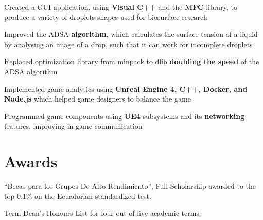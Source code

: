\documentclass[]{deedy-resume-openfont}
\begin{document}
\begin{minipage}[t]{0.66\textwidth}
\begin{tightemize}
    \item Created a GUI application, using \textbf{Visual C++} and the \textbf{MFC} library, to produce a variety of droplets shapes used for biosurface research
    \item Improved the ADSA \textbf{algorithm}, which calculates the surface tension of a liquid by analysing an image of a drop, such that it can work for incomplete droplets
    \item Replaced optimization library from minpack to dlib \textbf{doubling the speed} of the ADSA algorithm
\end{tightemize}
\sectionsep

\begin{tightemize}
    \item Implemented game analytics using \textbf{Unreal Engine 4, C++, Docker, and Node.js} which helped game designers to balance the game
    \item Programmed game components using \textbf{UE4} subsystems and its \textbf{networking} features, improving in-game communication
\end{tightemize}
\sectionsep


\section{Awards} 
\vspace{\topsep}
\begin{tightemize}
    \item “Becas para los Grupos De Alto Rendimiento”, Full Scholarship awarded to the top 0.1\% on the Ecuadorian standardized test.
    \item Term Dean's Honours List for four out of five academic terms.
\end{tightemize}
\sectionsep


\end{minipage}
\end{document}
